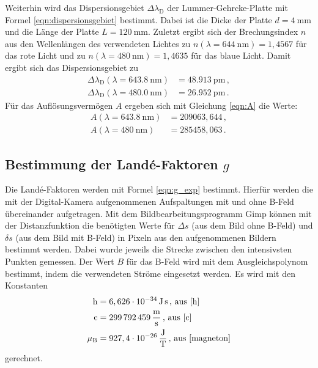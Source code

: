 	Weiterhin wird das Dispersionsgebiet $\Delta \lambda_{\mathrm{D}}$ der
	Lummer-Gehrcke-Platte mit Formel
	\eqref{eqn:dispersionsgebiet} bestimmt. Dabei ist die Dicke der Platte $d=\SI{4}{\milli\meter}$
	und die Länge der Platte  $L = \SI{120}{\milli\meter}$. Zuletzt ergibt sich der
	Brechungsindex $n$ aus den Wellenlängen des verwendeten Lichtes zu
	$n(\lambda=\SI{644}{\nano\meter}) = 1,4567$ für das rote Licht und zu
	$n(\lambda=\SI{480}{\nano\meter}) = 1,4635$ für das blaue Licht. Damit ergibt sich
	das Dispersionsgebiet zu
	\begin{align*}
		\Delta \lambda_{\mathrm{D}}(\lambda=\SI{643.8}{\nano\meter}) &= \SI{48.913}{\pico\meter} \, \mathrm{,} \\
		\Delta \lambda_{\mathrm{D}}(\lambda=\SI{480.0}{\nano\meter}) &= \SI{26.952}{\pico\meter} \, \mathrm{.}
	\end{align*}
	Für das Auflösungsvermögen $A$ ergeben sich mit Gleichung \eqref{eqn:A} die Werte:
\begin{align*}
	A(\lambda=\SI{643.8}{\nano\meter}) &= 209063,644 \, \mathrm{,} \\
	A(\lambda=\SI{480}{\nano\meter}) &= 285458,063 \, \mathrm{.}
\end{align*}

\subsection{Bestimmung der Landé-Faktoren $g$}
	Die Landé-Faktoren werden mit Formel \eqref{eqn:g_exp} bestimmt. Hierfür werden die mit der
	Digital-Kamera aufgenommenen Aufspaltungen mit und ohne B-Feld übereinander aufgetragen.
	Mit dem Bildbearbeitungsprogramm Gimp \cite{gimp} können mit der Distanzfunktion
	die benötigten
	Werte für $\Delta s$ (aus dem Bild ohne B-Feld) und $\delta s$ (aus dem Bild mit B-Feld)
	in Pixeln aus den aufgenommenen Bildern bestimmt werden. Dabei wurde jeweils die
	Strecke zwischen den intensivsten Punkten gemessen.
	Der Wert $B$ für das B-Feld wird mit dem Ausgleichspolynom bestimmt, indem die 
	verwendeten Ströme eingesetzt werden.
	Es wird mit den Konstanten
	\begin{align*}
		\mathrm{h} &= 6,626 \cdot 10^{-34} \, \si{\joule\second} \, \text{, aus \cite{h}} \\
		\mathrm{c} &= \SI{299792459}{\meter\per\second}\, \text{, aus \cite{c}} \\
		\mu_{\mathrm{B}} &= 927,4 \cdot 10^{-26} \, \si{\joule\per\tesla} \, \text{, aus \cite{magneton}}
	\end{align*}
	gerechnet.
	\FloatBarrier
